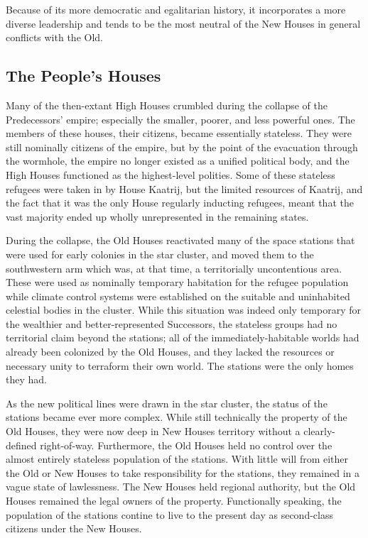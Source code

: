 \documentclass[11pt]{report}
\begin{document}
    Because of its more democratic and egalitarian history, it incorporates a more diverse leadership and tends to be the most neutral of the New Houses in general conflicts with the Old.
    \bigskip

    \subsection{The People's Houses}

    Many of the then-extant High Houses crumbled during the collapse of the Predecessors' empire; especially the smaller, poorer, and less powerful ones. The members of these houses, their citizens, became essentially stateless. They were still nominally citizens of the empire, but by the point of the evacuation through the wormhole, the empire no longer existed as a unified political body, and the High Houses functioned as the highest-level polities. Some of these stateless refugees were taken in by House Kaatrij, but the limited resources of Kaatrij, and the fact that it was the only House regularly inducting refugees, meant that the vast majority ended up wholly unrepresented in the remaining states.

    During the collapse, the Old Houses reactivated many of the space stations that were used for early colonies in the star cluster, and moved them to the southwestern arm which was, at that time, a territorially uncontentious area. These were used as nominally temporary habitation for the refugee population while climate control systems were established on the suitable and uninhabited celestial bodies in the cluster. While this situation was indeed only temporary for the wealthier and better-represented Successors, the stateless groups had no territorial claim beyond the stations; all of the immediately-habitable worlds had already been colonized by the Old Houses, and they lacked the resources or necessary unity to terraform their own world. The stations were the only homes they had.

    As the new political lines were drawn in the star cluster, the status of the stations became ever more complex. While still technically the property of the Old Houses, they were now deep in New Houses territory without a clearly-defined right-of-way. Furthermore, the Old Houses held no control over the almost entirely stateless population of the stations. With little will from either the Old or New Houses to take responsibility for the stations, they remained in a vague state of lawlessness. The New Houses held regional authority, but the Old Houses remained the legal owners of the property. Functionally speaking, the population of the stations contine to live to the present day as second-class citizens under the New Houses.
\end{document}
